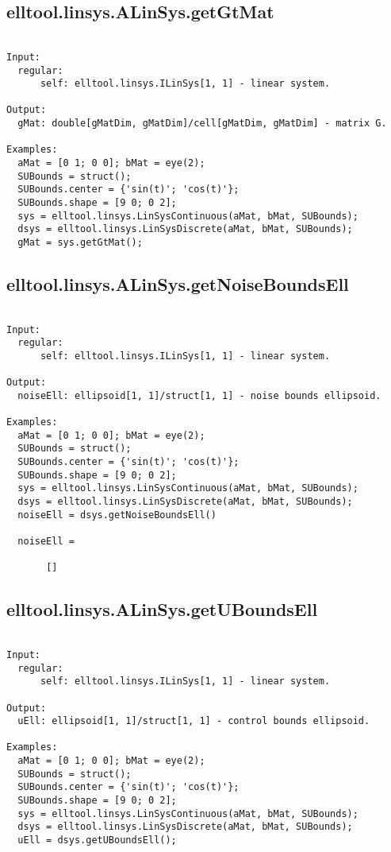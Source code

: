 \subsection{\texorpdfstring{elltool.linsys.ALinSys.getGtMat}{getGtMat}}\label{method:elltool.linsys.ALinSys.getGtMat}
\begin{verbatim}

Input:
  regular:
      self: elltool.linsys.ILinSys[1, 1] - linear system.

Output:
  gMat: double[gMatDim, gMatDim]/cell[gMatDim, gMatDim] - matrix G.

Examples:
  aMat = [0 1; 0 0]; bMat = eye(2);
  SUBounds = struct();
  SUBounds.center = {'sin(t)'; 'cos(t)'};
  SUBounds.shape = [9 0; 0 2];
  sys = elltool.linsys.LinSysContinuous(aMat, bMat, SUBounds);
  dsys = elltool.linsys.LinSysDiscrete(aMat, bMat, SUBounds);
  gMat = sys.getGtMat();
\end{verbatim}
\subsection{\texorpdfstring{elltool.linsys.ALinSys.getNoiseBoundsEll}{getNoiseBoundsEll}}\label{method:elltool.linsys.ALinSys.getNoiseBoundsEll}
\begin{verbatim}

Input:
  regular:
      self: elltool.linsys.ILinSys[1, 1] - linear system.

Output:
  noiseEll: ellipsoid[1, 1]/struct[1, 1] - noise bounds ellipsoid.

Examples:
  aMat = [0 1; 0 0]; bMat = eye(2);
  SUBounds = struct();
  SUBounds.center = {'sin(t)'; 'cos(t)'};
  SUBounds.shape = [9 0; 0 2];
  sys = elltool.linsys.LinSysContinuous(aMat, bMat, SUBounds);
  dsys = elltool.linsys.LinSysDiscrete(aMat, bMat, SUBounds);
  noiseEll = dsys.getNoiseBoundsEll()

  noiseEll =

       []
\end{verbatim}
\subsection{\texorpdfstring{elltool.linsys.ALinSys.getUBoundsEll}{getUBoundsEll}}\label{method:elltool.linsys.ALinSys.getUBoundsEll}
\begin{verbatim}

Input:
  regular:
      self: elltool.linsys.ILinSys[1, 1] - linear system.

Output:
  uEll: ellipsoid[1, 1]/struct[1, 1] - control bounds ellipsoid.

Examples:
  aMat = [0 1; 0 0]; bMat = eye(2);
  SUBounds = struct();
  SUBounds.center = {'sin(t)'; 'cos(t)'};
  SUBounds.shape = [9 0; 0 2];
  sys = elltool.linsys.LinSysContinuous(aMat, bMat, SUBounds);
  dsys = elltool.linsys.LinSysDiscrete(aMat, bMat, SUBounds);
  uEll = dsys.getUBoundsEll();
\end{verbatim}
